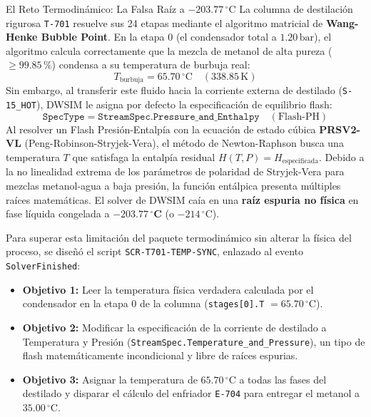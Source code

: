 \documentclass[11pt,a4paper]{article}
\begin{document}
\begin{pedagogico}{El Reto Termodinámico: La Falsa Raíz a $-203.77\,^\circ\text{C}$}
La columna de destilación rigurosa \texttt{T-701} resuelve sus 24 etapas mediante el algoritmo matricial de \textbf{Wang-Henke Bubble Point}. En la etapa 0 (el condensador total a $1.20\,\text{bar}$), el algoritmo calcula correctamente que la mezcla de metanol de alta pureza ($\ge 99.85\,\%$) condensa a su temperatura de burbuja real:
\begin{equation}
    T_{\text{burbuja}} = 65.70\,^\circ\text{C} \quad (338.85\,\text{K})
\end{equation}
Sin embargo, al transferir este fluido hacia la corriente externa de destilado (\texttt{S-15\_HOT}), DWSIM le asigna por defecto la especificación de equilibrio flash:
\begin{equation}
    \texttt{SpecType} = \texttt{StreamSpec.Pressure\_and\_Enthalpy} \quad (\text{Flash-PH})
\end{equation}
Al resolver un Flash Presión-Entalpía con la ecuación de estado cúbica \textbf{PRSV2-VL} (Peng-Robinson-Stryjek-Vera), el método de Newton-Raphson busca una temperatura $T$ que satisfaga la entalpía residual $H(T, P) = H_{\text{especificada}}$. Debido a la no linealidad extrema de los parámetros de polaridad de Stryjek-Vera para mezclas metanol-agua a baja presión, la función entálpica presenta múltiples raíces matemáticas. El solver de DWSIM caía en una \textbf{raíz espuria no física} en fase líquida congelada a $\mathbf{-203.77\,^\circ\text{C}}$ (o $-214\,^\circ\text{C}$).
\end{pedagogico}

Para superar esta limitación del paquete termodinámico sin alterar la física del proceso, se diseñó el script \texttt{SCR-T701-TEMP-SYNC}, enlazado al evento \texttt{SolverFinished}:
\begin{itemize}
    \item \textbf{Objetivo 1:} Leer la temperatura física verdadera calculada por el condensador en la etapa 0 de la columna (\texttt{stages[0].T} $= 65.70\,^\circ\text{C}$).
    \item \textbf{Objetivo 2:} Modificar la especificación de la corriente de destilado a Temperatura y Presión (\texttt{StreamSpec.Temperature\_and\_Pressure}), un tipo de flash matemáticamente incondicional y libre de raíces espurias.
    \item \textbf{Objetivo 3:} Asignar la temperatura de $65.70\,^\circ\text{C}$ a todas las fases del destilado y disparar el cálculo del enfriador \texttt{E-704} para entregar el metanol a $35.00\,^\circ\text{C}$.
\end{itemize}
\end{document}
